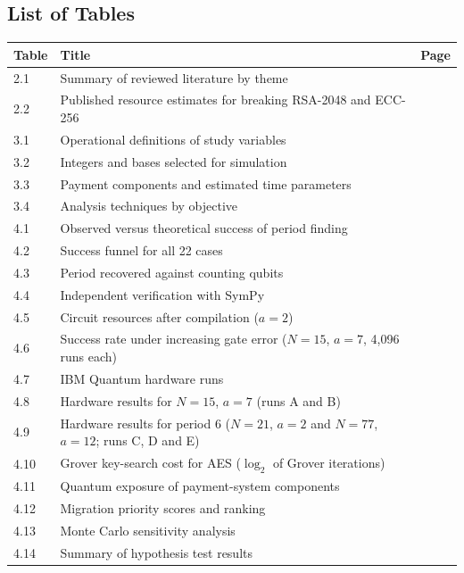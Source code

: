 \documentclass[12pt,oneside]{report}
\begin{document}
\subsection*{List of Tables}

\begin{center}\small\begin{tabularx}{\textwidth}{|P{0.1\textwidth}|W|P{0.1\textwidth}|}\hline
Table & Title & Page \\ & Summary of reviewed literature by theme & \pageref{tab:2.1} \\ & Published resource estimates for breaking RSA-2048 and ECC-256 & \pageref{tab:2.2} \\ & Operational definitions of study variables & \pageref{tab:3.1} \\ & Integers and bases selected for simulation & \pageref{tab:3.2} \\ & Payment components and estimated time parameters & \pageref{tab:3.3} \\ & Analysis techniques by objective & \pageref{tab:3.4} \\ & Observed versus theoretical success of period finding & \pageref{tab:4.1} \\ & Success funnel for all 22 cases & \pageref{tab:4.2} \\ & Period recovered against counting qubits & \pageref{tab:4.3} \\ & Independent verification with SymPy & \pageref{tab:4.4} \\ & Circuit resources after compilation ($a = 2$) & \pageref{tab:4.5} \\ & Success rate under increasing gate error ($N = 15$, $a = 7$, 4,096 runs each) & \pageref{tab:4.6} \\ & IBM Quantum hardware runs & \pageref{tab:4.7} \\ & Hardware results for $N = 15$, $a = 7$ (runs A and B) & \pageref{tab:4.8} \\ & Hardware results for period 6 ($N = 21$, $a = 2$ and $N = 77$, $a = 12$; runs C, D and E) & \pageref{tab:4.9} \\ & Grover key-search cost for AES ($\log_{2}$ of Grover iterations) & \pageref{tab:4.10} \\ & Quantum exposure of payment-system components & \pageref{tab:4.11} \\ & Migration priority scores and ranking & \pageref{tab:4.12} \\ & Monte Carlo sensitivity analysis & \pageref{tab:4.13} \\ & Summary of hypothesis test results & \pageref{tab:4.14} \\\hline
\end{tabularx}\end{center}
\end{document}
